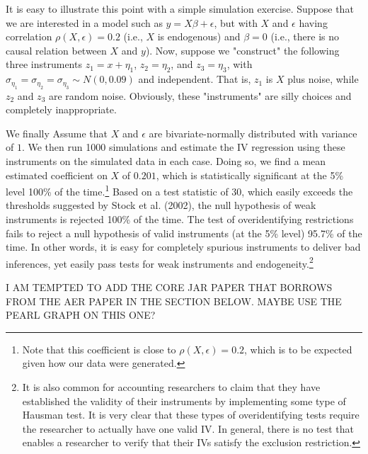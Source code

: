 \documentclass[11pt]{amsart}
\begin{document}

It is easy to illustrate this point with a simple simulation exercise.
Suppose that we are interested in a model such as $y = X \beta + \epsilon$, but with $X$ and $\epsilon$ having correlation $\rho(X, \epsilon) = 0.2$ (i.e., $X$ is endogenous) and $\beta = 0$ (i.e., there is no causal relation between $X$ and $y$). 
Now, suppose we "construct" the following three instruments 
$z_1 = x +\eta_1$, $z_2 = \eta_2$, and $z_3 = \eta_3$, with $\sigma_{\eta_1} = \sigma_{\eta_2} = \sigma_{\eta_3} \sim N(0, 0.09)$ and independent. 
That is, $z_1$ is $X$ plus noise, while $z_2$ and $z_3$ are random noise.  Obviously, these "instruments" are silly choices and completely inappropriate.

We finally  Assume that $X$ and $\epsilon$ are bivariate-normally distributed with variance of $1$. We then run 1000 simulations and  estimate the IV regression using these instruments on the simulated data in each case. Doing so, we find a mean estimated coefficient on $X$ of $0.201$, which is statistically significant at the 5\% level 100\% of the time.\footnote{Note that this coefficient is close to $\rho(X, \epsilon) = 0.2$, which is to be expected given how our data were generated.} Based on a test statistic of 30, which easily exceeds the thresholds suggested by Stock et al. (2002), the null hypothesis of weak instruments is rejected 100\% of the time. 
The test of overidentifying restrictions fails to reject a null hypothesis of valid instruments (at the 5\% level) 95.7\% of the time.
In other words, it is easy for completely spurious instruments to deliver bad inferences, yet easily pass tests for weak instruments and endogeneity.\footnote{It is also common for accounting researchers to claim that they have established the validity of their instruments by implementing some type of Hausman test.  It is very clear that these types of overidentifying tests require the researcher to actually have one valid IV.  In general, there is no test that enables a researcher to verify that their IVs satisfy the exclusion restriction.}


I AM TEMPTED TO ADD THE CORE JAR PAPER THAT BORROWS FROM THE AER PAPER IN THE SECTION BELOW.  MAYBE USE THE PEARL GRAPH ON THIS ONE?
\end{document}
